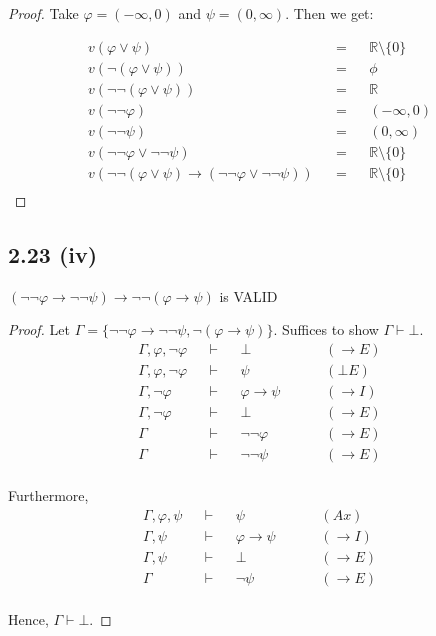 \documentclass[12pt]{article}
\begin{document}
\begin{proof}
Take $\varphi = (-\infty,0)$ and $\psi = (0,\infty)$. Then we get:

\begin{align*}
    v(\varphi \vee \psi) &&=&& \mathbb{R} \setminus \{0\} \\
    v(\neg (\varphi \vee \psi)) &&=&& \phi \\
    v(\neg \neg (\varphi \vee \psi)) &&=&& \mathbb{R} \\
    v(\neg \neg \varphi) &&=&& (-\infty, 0) \\
    v(\neg \neg \psi) &&=&& (0, \infty) \\
    v(\neg \neg \varphi \vee \neg \neg \psi) &&=&& \mathbb{R} \setminus \{0\} \\
    v(\neg \neg(\varphi \vee \psi) \rightarrow (\neg \neg \varphi \vee \neg \neg \psi)) &&=&& \mathbb{R} \setminus \{0\} \\
\end{align*}
\end{proof}

\subsection*{2.23 (iv)} 
$(\neg \neg \varphi \rightarrow \neg \neg \psi) \rightarrow \neg \neg (\varphi \rightarrow \psi)$ is VALID

\begin{proof}
Let $\Gamma = \{\neg \neg \varphi \rightarrow \neg \neg \psi, \neg(\varphi \rightarrow \psi)\}$. Suffices to show $\Gamma \vdash \bot$.
\begin{align*}
    \Gamma, \varphi, \neg \varphi &&\vdash&& \bot &&&& (\rightarrow E) \\
    \Gamma, \varphi, \neg \varphi &&\vdash&& \psi &&&& (\bot E) \\
    \Gamma, \neg \varphi &&\vdash&& \varphi \rightarrow \psi &&&& (\rightarrow I) \\
    \Gamma, \neg \varphi &&\vdash&& \bot &&&& (\rightarrow E) \\
    \Gamma &&\vdash&& \neg \neg \varphi &&&& (\rightarrow E) \\
    \Gamma &&\vdash&& \neg \neg \psi &&&& (\rightarrow E) \\
\end{align*}

Furthermore,
\begin{align*}
    \Gamma, \varphi, \psi &&\vdash&& \psi &&&& (Ax) \\
    \Gamma, \psi &&\vdash&& \varphi \rightarrow \psi &&&& (\rightarrow I) \\
    \Gamma, \psi &&\vdash&& \bot &&&& (\rightarrow E) \\
    \Gamma &&\vdash&& \neg \psi &&&& (\rightarrow E) \\
\end{align*}

Hence, $\Gamma \vdash \bot$.
\end{proof}
\end{document}
